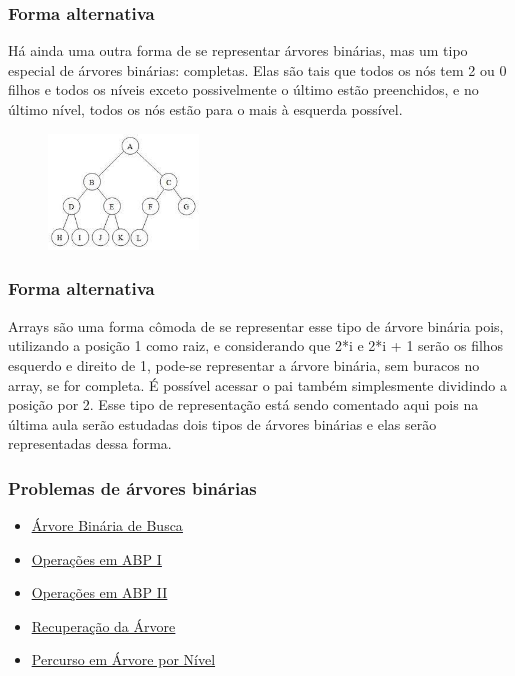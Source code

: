 \documentclass{beamer}
\begin{document}
	\begin{frame}
	\frametitle{Forma alternativa}
		Há ainda uma outra forma de se representar árvores
		binárias, mas um tipo especial de árvores binárias: completas.
		Elas são tais que todos os nós tem 2 ou 0 filhos e todos os
		níveis exceto possivelmente o último estão preenchidos, e no
		último nível, todos os nós estão para o mais à esquerda possível.
		\begin{figure}[H]
			\centering
			\includegraphics[width=4cm]{heap.png}
		\end{figure}
	\end{frame}

	\begin{frame}
	\frametitle{Forma alternativa}
		Arrays são uma forma cômoda de se representar esse tipo
		de árvore binária pois, utilizando a posição 1 como raiz, e
		considerando que 2*i e 2*i + 1 serão os filhos esquerdo e direito
		de 1, pode-se representar a árvore binária, sem buracos no array,
		se for completa. É possível acessar o pai também simplesmente
		dividindo a posição por 2. Esse tipo de representação está
		sendo comentado aqui pois na última aula serão estudadas dois
		tipos de árvores binárias e elas serão representadas dessa forma.
	\end{frame}

	\begin{frame}
	\frametitle{Problemas de árvores binárias}
	\begin{itemize}
	\item \textcolor{blue}{\underline{\href{https://www.urionlinejudge.com.br/judge/pt/problems/view/1195}{Árvore Binária de Busca}}}
	\item \textcolor{blue}{\underline{\href{https://www.urionlinejudge.com.br/judge/pt/problems/view/1200}{Operações em ABP I}}}
	\item \textcolor{blue}{\underline{\href{https://www.urionlinejudge.com.br/judge/pt/problems/view/1201}{Operações em ABP II}}}
	\item \textcolor{blue}{\underline{\href{https://www.urionlinejudge.com.br/judge/pt/problems/view/1191}{Recuperação da Árvore}}}
	\item \textcolor{blue}{\underline{\href{https://www.urionlinejudge.com.br/judge/pt/problems/view/1466}{Percurso em Árvore por Nível}}}
	\end{itemize}
	\end{frame}
\end{document}
